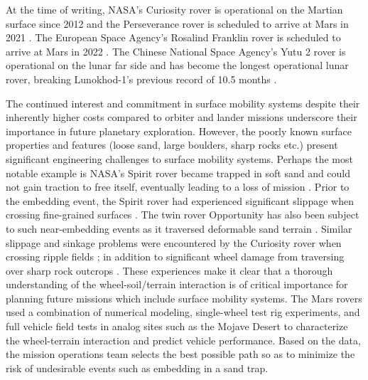 \documentclass{article}
\begin{document}
At the time of writing, NASA's Curiosity rover is operational on the Martian surface since 2012 and the Perseverance rover is scheduled to arrive at Mars in 2021 \cite{welch2013systems,williford2018nasa}. The European Space Agency's Rosalind Franklin rover is scheduled to arrive at Mars in 2022 \cite{vago2017habitability}. The Chinese National Space Agency's Yutu 2 rover is operational on the lunar far side and has become the longest operational lunar rover, breaking Lunokhod-1's previous record of 10.5 months \cite{ling2019close}.

The continued interest and commitment in surface mobility systems despite their inherently higher costs compared to orbiter and lander missions underscore their importance in future planetary exploration. However, the poorly known surface properties and features (loose sand, large boulders, sharp rocks etc.) present significant engineering challenges to surface mobility systems. Perhaps the most notable example is NASA's Spirit rover became trapped in soft sand and could not gain traction to free itself, eventually leading to a loss of mission \cite{lorenz2014moving}. Prior to the embedding event, the Spirit rover had experienced significant slippage when crossing fine-grained surfaces \cite{li2008characterization}. The twin rover Opportunity has also been subject to such near-embedding events as it traversed deformable sand terrain \cite{zhou2014simulations,arvidson2011opportunity}. Similar slippage and sinkage problems were encountered by the Curiosity rover when crossing ripple fields \cite{arvidson2014roving}; in addition to significant wheel damage from traversing over sharp rock outcrops \cite{arvidson2017relating}. These experiences make it clear that a thorough understanding of the wheel-soil/terrain interaction is of critical importance for planning future missions which include surface mobility systems. The Mars rovers used a combination of numerical modeling, single-wheel test rig experiments, and full vehicle field tests in analog sites such as the Mojave Desert to characterize the wheel-terrain interaction and predict vehicle performance. Based on the data, the mission operations team selects the best possible path so as to minimize the risk of undesirable events such as embedding in a sand trap.
\end{document}

